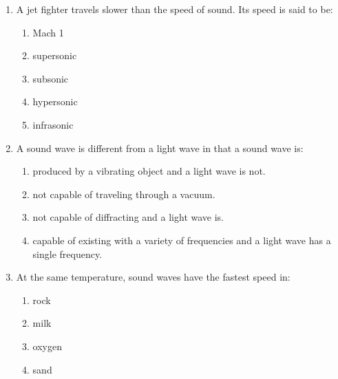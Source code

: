 \begin{enumerate}[noitemsep, label=\textbf{\arabic*}. ]
\begin{table}[H]
\begin{center}
\begin{xtabular}[t]{|l|l|l|}
    \end{xtabular}
      \end{center}
    \begin{center}{\small\bfseries Table 9.6}\end{center}
    \begin{caption}{\small\bfseries Table 9.6}\end{caption}
\end{table}
    \par
          \label{m38800*uid66}\item A jet fighter travels slower than the speed of sound. Its speed is said to be:
\label{m38800*id186857}\begin{enumerate}[noitemsep, label=\textbf{\alph*}. ] 
            \label{m38800*uid67}\item Mach 1
\label{m38800*uid68}\item supersonic
\label{m38800*uid69}\item subsonic
\label{m38800*uid70}\item hypersonic
\label{m38800*uid71}\item infrasonic
\end{enumerate}
                \label{m38800*uid72}\item A sound wave is different from a light wave in that a sound wave is:
\label{m38800*id186936}\begin{enumerate}[noitemsep, label=\textbf{\alph*}. ] 
            \label{m38800*uid73}\item produced by a vibrating object and a light wave is not.
\label{m38800*uid74}\item not capable of traveling through a vacuum.
\label{m38800*uid75}\item not capable of diffracting and a light wave is.
\label{m38800*uid76}\item capable of existing with a variety of frequencies and a light wave has a single frequency.
\end{enumerate}
                \label{m38800*uid77}\item At the same temperature, sound waves have the fastest speed in:
\label{m38800*id187004}\begin{enumerate}[noitemsep, label=\textbf{\alph*}. ] 
            \label{m38800*uid78}\item rock
\label{m38800*uid79}\item milk
\label{m38800*uid80}\item oxygen
\label{m38800*uid81}\item sand

\end{enumerate}
\end{enumerate}
